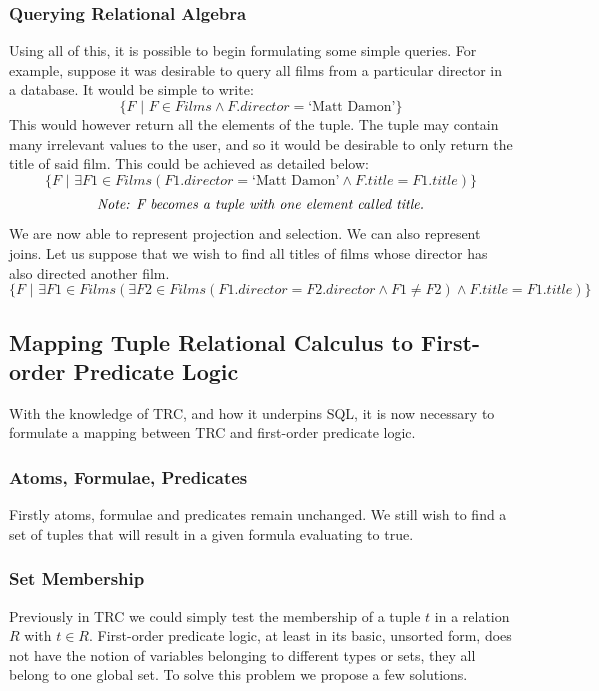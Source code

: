 \documentclass[a4paper, 11pt]{article}
\begin{document}
    \subsubsection{Querying Relational Algebra}
      Using all of this, it is possible to begin formulating some simple
      queries. For example, suppose it was desirable to query all films from a
      particular director in a database. It would be simple to write:
      $$ \{F\text{ | }F \in Films \land F.director = \text{`Matt Damon'}\} $$
      This would however return all the elements of the tuple. The tuple may
      contain many irrelevant values to the user, and so it would be desirable
      to only return the title of said film. This could be achieved as detailed
      below:
      $$ \{F\text{ | } \exists F1 \in Films(F1.director = \text{`Matt Damon'}
           \land F.title = F1.title)\} $$
      $$ \emph{Note: F becomes a tuple with one element called title.} $$
      We are now able to represent projection and selection. We can also
      represent joins. Let us suppose that we wish to find all titles of films
      whose director has also directed another film.
      $$ \{F\text{ | }\exists F1 \in Films(\exists F2 \in Films(F1.director =
           F2.director \land F1 \neq F2) \land F.title = F1.title)\} $$

  \subsection{Mapping Tuple Relational Calculus to First-order Predicate Logic}
    \label{sec:tuplefo}
    With the knowledge of TRC, and how it underpins SQL, it is now necessary to
    formulate a mapping between TRC and first-order predicate logic.

    \subsubsection{Atoms, Formulae, Predicates}
      Firstly atoms, formulae and predicates remain unchanged. We still wish to
      find a set of tuples that will result in a given formula evaluating to
      true.

    \subsubsection{Set Membership}
      Previously in TRC we could simply test the membership of a tuple $t$ in a
      relation $R$ with $t \in R$. First-order predicate logic, at least in its
      basic, unsorted form, does not have the notion of variables belonging to
      different types or sets, they all belong to one global set. To solve this
      problem we propose a few solutions.
\end{document}
